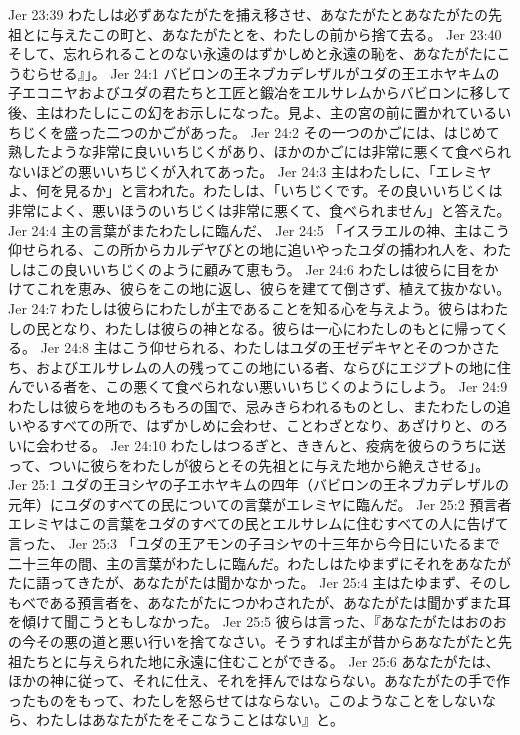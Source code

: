 Jer 23:39  わたしは必ずあなたがたを捕え移させ、あなたがたとあなたがたの先祖とに与えたこの町と、あなたがたとを、わたしの前から捨て去る。
Jer 23:40  そして、忘れられることのない永遠のはずかしめと永遠の恥を、あなたがたにこうむらせる』」。
Jer 24:1  バビロンの王ネブカデレザルがユダの王エホヤキムの子エコニヤおよびユダの君たちと工匠と鍛冶をエルサレムからバビロンに移して後、主はわたしにこの幻をお示しになった。見よ、主の宮の前に置かれているいちじくを盛った二つのかごがあった。
Jer 24:2  その一つのかごには、はじめて熟したような非常に良いいちじくがあり、ほかのかごには非常に悪くて食べられないほどの悪いいちじくが入れてあった。
Jer 24:3  主はわたしに、「エレミヤよ、何を見るか」と言われた。わたしは、「いちじくです。その良いいちじくは非常によく、悪いほうのいちじくは非常に悪くて、食べられません」と答えた。
Jer 24:4  主の言葉がまたわたしに臨んだ、
Jer 24:5  「イスラエルの神、主はこう仰せられる、この所からカルデヤびとの地に追いやったユダの捕われ人を、わたしはこの良いいちじくのように顧みて恵もう。
Jer 24:6  わたしは彼らに目をかけてこれを恵み、彼らをこの地に返し、彼らを建てて倒さず、植えて抜かない。
Jer 24:7  わたしは彼らにわたしが主であることを知る心を与えよう。彼らはわたしの民となり、わたしは彼らの神となる。彼らは一心にわたしのもとに帰ってくる。
Jer 24:8  主はこう仰せられる、わたしはユダの王ゼデキヤとそのつかさたち、およびエルサレムの人の残ってこの地にいる者、ならびにエジプトの地に住んでいる者を、この悪くて食べられない悪いいちじくのようにしよう。
Jer 24:9  わたしは彼らを地のもろもろの国で、忌みきらわれるものとし、またわたしの追いやるすべての所で、はずかしめに会わせ、ことわざとなり、あざけりと、のろいに会わせる。
Jer 24:10  わたしはつるぎと、ききんと、疫病を彼らのうちに送って、ついに彼らをわたしが彼らとその先祖とに与えた地から絶えさせる」。
Jer 25:1  ユダの王ヨシヤの子エホヤキムの四年（バビロンの王ネブカデレザルの元年）にユダのすべての民についての言葉がエレミヤに臨んだ。
Jer 25:2  預言者エレミヤはこの言葉をユダのすべての民とエルサレムに住むすべての人に告げて言った、
Jer 25:3  「ユダの王アモンの子ヨシヤの十三年から今日にいたるまで二十三年の間、主の言葉がわたしに臨んだ。わたしはたゆまずにそれをあなたがたに語ってきたが、あなたがたは聞かなかった。
Jer 25:4  主はたゆまず、そのしもべである預言者を、あなたがたにつかわされたが、あなたがたは聞かずまた耳を傾けて聞こうともしなかった。
Jer 25:5  彼らは言った、『あなたがたはおのおの今その悪の道と悪い行いを捨てなさい。そうすれば主が昔からあなたがたと先祖たちとに与えられた地に永遠に住むことができる。
Jer 25:6  あなたがたは、ほかの神に従って、それに仕え、それを拝んではならない。あなたがたの手で作ったものをもって、わたしを怒らせてはならない。このようなことをしないなら、わたしはあなたがたをそこなうことはない』と。
